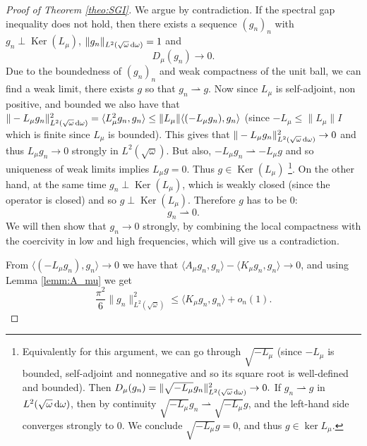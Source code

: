 \documentclass[reqno,11pt,letterpaper]{amsart}
\numberwithin{equation}{section}
\newcommand{\dd}{\, {\rm d}}
\begin{document}
\begin{proof}[Proof of Theorem \ref{theo:SGI}]
  We argue by contradiction. If the spectral gap inequality does not hold, then there exists a sequence $(g_n)_n$ with $g_n \perp \operatorname{Ker}(L_\mu)$, $\|g_n\|_{L^2(\sqrt{\omega}\dd\omega)}=1$ and $$ D_\mu(g_n) \to 0.$$
  Due to the boundedness of $(g_n)_n$ and weak compactness of the unit ball, we can find a weak limit, there exists $g$ so that $g_n \rightharpoonup g$. Now since $L_\mu$ is self-adjoint, non positive, and bounded we also have that $\|-L_\mu g_n\|_{L^2(\sqrt{\omega}\dd\omega)}^2 = \langle L_\mu^2 g_n,g_n \rangle \leq \|L_\mu\| \langle (-L_\mu g_n),g_n \rangle $ (since $-L_\mu \leq \|L_\mu\| I$ which is finite since $L_\mu$ is bounded). This gives that $\|-L_\mu g_n\|_{L^2(\sqrt{\omega}\dd\omega)}^2 \to 0$ and thus $L_\mu g_n \to 0$ strongly in $L^2(\sqrt{\omega})$. But also, $-L_\mu g_n \rightharpoonup -L_\mu g$ and so uniqueness of weak limits implies $L_\mu g=0$.  Thus $g \in \operatorname{Ker}(L_\mu)$ \footnote{
Equivalently for this argument, we can go through $\sqrt{-L_\mu}$ (since $-L_\mu$ is bounded, self-adjoint and nonnegative and so its square root is well-defined and bounded). Then $D_\mu(g_n)=\|\sqrt{-L_\mu} g_n\|_{L^2(\sqrt{\omega}\dd\omega)}^2\to 0.$
If $g_n\rightharpoonup g$ in ${L^2(\sqrt{\omega}\dd\omega)}$, then by continuity $\sqrt{-L_\mu} g_n \rightharpoonup \sqrt{-L_\mu} g$, and the left-hand side converges strongly to $0$. We conclude $\sqrt{-L_\mu} g=0$, and thus $g\in\ker L_\mu$.}. On the other hand, at the same time $g_n\perp \operatorname{Ker}(L_\mu)$, which is weakly closed (since the operator is closed) and so $g \perp \operatorname{Ker}(L_\mu)$. Therefore $g$ has to be $0$: $$g_n \rightharpoonup 0. $$ We will then show that $g_n \to 0$ strongly, by combining the local compactness with the coercivity in low and high frequencies, which will give us a contradiction. 

  From $\langle (-L_\mu g_n),g_n \rangle \to 0$ we have that $\langle A_\mu g_n, g_n\rangle - \langle K_\mu g_n, g_n\rangle \to 0$, and using Lemma \ref{lemm:A_mu} we get 
  \begin{equation}\label{eq:lowerbound on K_m}
  \frac{\pi^2}{6} \|g_n\|_{L^2(\sqrt{\omega})}^2 \leq \langle K_\mu g_n, g_n\rangle + o_n(1).
  \end{equation}
  

\end{proof}
\end{document}
